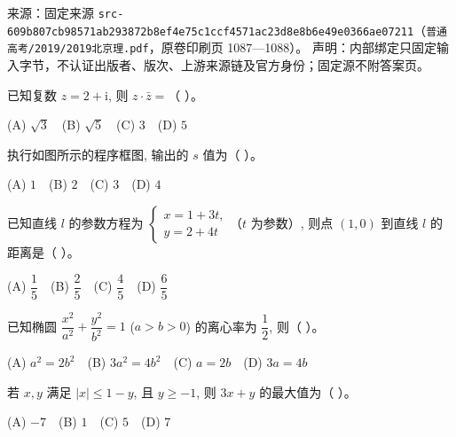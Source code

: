 
\begin{gktip}
来源：固定来源 \texttt{src-609b807cb98571ab293872b8ef4e75c1ccf4571ac23d8e8b6e49e0366ae07211}（\texttt{普通高考/2019/2019北京理.pdf}，原卷印刷页 1087—1088）。
声明：内部绑定只固定输入字节，不认证出版者、版次、上游来源链及官方身份；固定源不附答案页。
\end{gktip}

\par\medskip


\begin{question}
已知复数 $z = 2 + \mathrm{i}$, 则 $z \cdot \bar{z} =$（ ）。

(A) $\sqrt{3}$　(B) $\sqrt{5}$　(C) $3$　(D) $5$

\Needspace{0.4\textheight}
\end{question}
\begin{question}
执行如图所示的程序框图, 输出的 $s$ 值为（ ）。
\nopagebreak[4]
\begin{center}\end{center}
\nopagebreak[4]
(A) $1$　(B) $2$　(C) $3$　(D) $4$

\end{question}
\begin{question}
已知直线 $l$ 的参数方程为 $\begin{cases} x = 1 + 3t, \\ y = 2 + 4t \end{cases}$（$t$ 为参数）, 则点 $(1, 0)$ 到直线 $l$ 的距离是（ ）。

(A) $\dfrac{1}{5}$　(B) $\dfrac{2}{5}$　(C) $\dfrac{4}{5}$　(D) $\dfrac{6}{5}$

\end{question}
\begin{question}
已知椭圆 $\dfrac{x^2}{a^2} + \dfrac{y^2}{b^2} = 1$ ($a > b > 0$) 的离心率为 $\dfrac{1}{2}$, 则（ ）。

(A) $a^2 = 2b^2$　(B) $3a^2 = 4b^2$　(C) $a = 2b$　(D) $3a = 4b$

\end{question}
\begin{question}
若 $x, y$ 满足 $|x| \leqslant 1 - y$, 且 $y \geqslant -1$, 则 $3x + y$ 的最大值为（ ）。

(A) $-7$　(B) $1$　(C) $5$　(D) $7$

\end{question}
